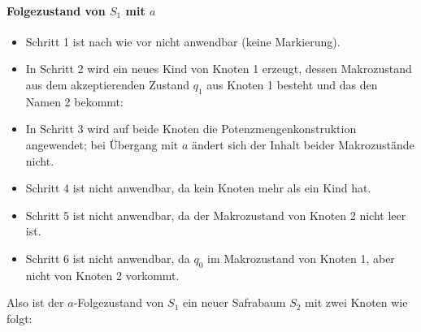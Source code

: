 \documentclass[fontsize=11pt, twoside=false, numbers=autoenddot]{scrbook}
\begin{document}
\paragraph*{{\boldmath Folgezustand von $S_1$ mit $a$}}
%
\begin{itemize}
  \item
    Schritt 1 ist nach wie vor nicht anwendbar (keine Markierung).
  \item
    In Schritt 2 wird ein neues Kind von Knoten 1 erzeugt,
    dessen Makrozustand aus dem akzeptierenden Zustand $q_1$
    aus Knoten 1 besteht und das den Namen 2 bekommt:
    \begin{center}
    \end{center}
  \item
    In Schritt 3 wird auf beide Knoten die Potenzmengenkonstruktion angewendet;
    bei Übergang mit $a$ ändert sich der Inhalt beider Makrozustände nicht.
  \item
    Schritt 4 ist nicht anwendbar, da kein Knoten mehr als ein Kind hat.
  \item
    Schritt 5 ist nicht anwendbar, da der Makrozustand von Knoten 2 nicht leer ist.
  \item
    Schritt 6 ist nicht anwendbar, da $q_0$ im Makrozustand von Knoten 1,
    aber nicht von Knoten 2 vorkommt. 
\end{itemize}
%
Also ist der $a$-Folgezustand von $S_1$ ein neuer Safrabaum $S_2$
mit zwei Knoten wie folgt:
%
\end{document}

